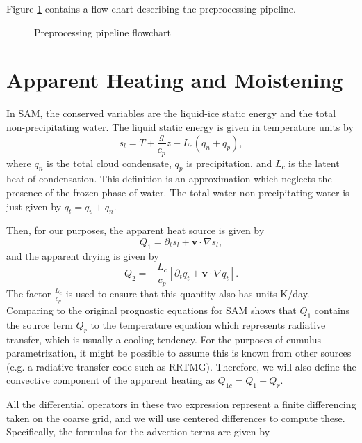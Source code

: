 \documentclass{report}
\begin{document}
Figure \ref{fig:preprocess} contains a flow chart describing the preprocessing pipeline.

\begin{figure}
  \centering
  
  \caption{Preprocessing pipeline flowchart}
  \label{fig:preprocess}
\end{figure}
\section{Apparent Heating and Moistening}
\label{sec:q1q2}

In SAM, the conserved variables are the liquid-ice static energy and the total non-precipitating water. The liquid static energy is given in temperature units by 
\[ s_l = T + \frac{g}{c_p} z - L_c(q_n + q_p),\]
where $q_n$ is the total cloud condensate, $q_p$ is precipitation, and $L_c$ is the latent heat of condensation. This definition is an approximation which neglects the presence of the frozen phase of water. The total water non-precipitating water is just given by 
$q_t = q_v + q_n.$

Then, for our purposes, the apparent heat source is given by
\[Q_1 = \partial_t {s_l} + \mathbf{v}\cdot \nabla s_l, \]
and the apparent drying is given by
\[Q_2 = - \frac{L_c}{c_p} \left[\partial_t {q_t} + \mathbf{v} \cdot \nabla q_t\right].\]
The factor $\frac{L_c}{c_p}$ is used to ensure that this quantity also has units K/day. Comparing to the original prognostic equations for SAM shows that $Q_1$ contains the source term  $Q_r$ to the temperature equation which represents radiative transfer, which is usually a cooling tendency. For the purposes of cumulus parametrization, it might be possible to assume this is known from other sources (e.g. a radiative transfer code such as RRTMG). Therefore, we will also define the convective component of the apparent heating as $Q_{1c} = Q_1 - Q_r$. 

All the differential operators in these two expression represent a finite
differencing taken on the coarse grid, and we will use centered differences to
compute these. Specifically, the formulas for the advection terms are given
by
\renewcommand{\bf}{\bar{f}_{i,j}}
\end{document}
